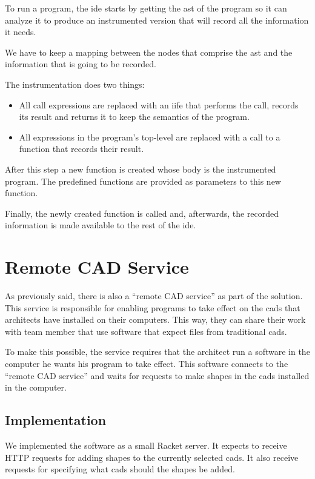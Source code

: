 To run a program, the \gls{ide} starts by getting the \gls{ast} of the program so it can analyze it to produce an instrumented version that will record all the information it needs.

We have to keep a mapping between the nodes that comprise the \gls{ast} and the information that is going to be recorded.

The instrumentation does two things:
\begin{itemize}
  \item All call expressions are replaced with an \gls{iife} that performs the call, records its result and returns it to keep the semantics of the program.
  \item All expressions in the program's top-level are replaced with a call to a function that records their result.
\end{itemize}

After this step a new function is created whose body is the instrumented program.
The predefined functions are provided as parameters to this new function.

Finally, the newly created function is called and, afterwards, the recorded information is made available to the rest of the \gls{ide}.


\section{Remote CAD Service}
As previously said, there is also a ``remote CAD service'' as part of the solution.
This service is responsible for enabling programs to take effect on the \glspl{cad} that architects have installed on their computers.
This way, they can share their work with team member that use software that expect files from traditional \glspl{cad}.

To make this possible, the service requires that the architect run a software in the computer he wants his program to take effect.
This software connects to the ``remote CAD service'' and waits for requests to make shapes in the \glspl{cad} installed in the computer.

\subsection{Implementation}
We implemented the software as a small Racket server.
It expects to receive HTTP requests for adding shapes to the currently selected \glspl{cad}.
It also receive requests for specifying what \glspl{cad} should the shapes be added.

